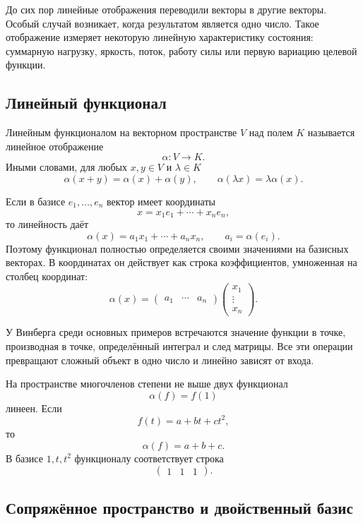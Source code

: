 До сих пор линейные отображения переводили векторы в другие векторы. Особый случай возникает, когда результатом является одно число. Такое отображение измеряет некоторую линейную характеристику состояния: суммарную нагрузку, яркость, поток, работу силы или первую вариацию целевой функции.

\subsection{Линейный функционал}

\begin{definition}
Линейным функционалом на векторном пространстве \(V\) над полем \(K\) называется линейное отображение
\[
\alpha:V\to K.
\]
Иными словами, для любых \(x,y\in V\) и \(\lambda\in K\)
\[
\alpha(x+y)=\alpha(x)+\alpha(y),
\qquad
\alpha(\lambda x)=\lambda\alpha(x).
\]
\end{definition}

Если в базисе \(e_1,\dots,e_n\) вектор имеет координаты
\[
x=x_1e_1+\cdots+x_ne_n,
\]
то линейность даёт
\[
\alpha(x)=a_1x_1+\cdots+a_nx_n,
\qquad
 a_i=\alpha(e_i).
\]
Поэтому функционал полностью определяется своими значениями на базисных векторах. В координатах он действует как строка коэффициентов, умноженная на столбец координат:
\[
\alpha(x)=
\begin{pmatrix}
 a_1&\cdots&a_n
\end{pmatrix}
\begin{pmatrix}
 x_1\\ \vdots\\ x_n
\end{pmatrix}.
\]

У Винберга среди основных примеров встречаются значение функции в точке, производная в точке, определённый интеграл и след матрицы. Все эти операции превращают сложный объект в одно число и линейно зависят от входа.

\begin{example}
На пространстве многочленов степени не выше двух функционал
\[
\alpha(f)=f(1)
\]
линеен. Если
\[
f(t)=a+bt+ct^2,
\]
то
\[
\alpha(f)=a+b+c.
\]
В базисе \(1,t,t^2\) функционалу соответствует строка
\[
\begin{pmatrix}1&1&1\end{pmatrix}.
\]
\end{example}

\subsection{Сопряжённое пространство и двойственный базис}

